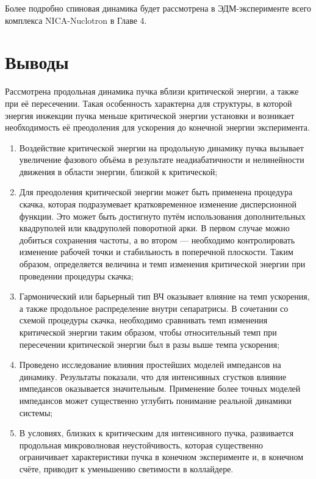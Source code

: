 \par Более подробно спиновая динамика будет рассмотрена в ЭДМ-эксперименте всего комплекса NICA-Nuclotron в Главе 4.

\section*{Выводы}
\par Рассмотрена продольная динамика пучка вблизи критической энергии, а также при её пересечении. Такая особенность характерна для структуры, в которой энергия инжекции пучка меньше критической энергии установки и возникает необходимость её преодоления для ускорения до конечной энергии эксперимента.

\begin{enumerate}

\item Воздействие критической энергии на продольную динамику пучка вызывает увеличение фазового объёма в результате неадиабатичности и нелинейности движения в области энергии, близкой к критической;

\item Для преодоления критической энергии может быть применена процедура скачка, которая подразумевает кратковременное изменение дисперсионной функции. Это может быть достигнуто путём использования дополнительных квадруполей или квадруполей поворотной арки. В первом случае можно добиться сохранения частоты, а во втором — необходимо контролировать изменение рабочей точки и стабильность в поперечной плоскости. Таким образом, определяется величина и темп изменения критической энергии при проведении процедуры скачка;

\item Гармонический или барьерный тип ВЧ оказывает влияние на темп ускорения, а также продольное распределение внутри сепаратрисы. В сочетании со схемой процедуры скачка, необходимо сравнивать темп изменения критической энергии таким образом, чтобы относительный темп при пересечении критической энергии был в разы выше темпа ускорения;

\item Проведено исследование влияния простейших моделей импедансов на динамику. Результаты показали, что для интенсивных сгустков влияние импедансов оказывается значительным. Применение более точных моделей импедансов может существенно углубить понимание реальной динамики системы;

\item В условиях, близких к критическим для интенсивного пучка, развивается продольная микроволновая неустойчивость, которая существенно ограничивает характеристики пучка в конечном эксперименте и, в конечном счёте, приводит к уменьшению светимости в коллайдере.

\end{enumerate}


\FloatBarrier
